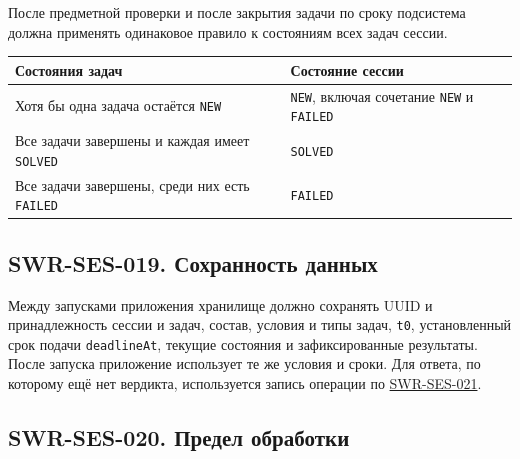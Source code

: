 \documentclass[12pt,a4paper]{article}
\begin{document}
\hypertarget{swr-ses-018-общая-функция-итога-сессии}{}

\hypertarget{swr-ses-018}{}

После предметной проверки и после закрытия задачи по сроку подсистема должна применять одинаковое правило к состояниям всех задач сессии.

{\def\LTcaptype{none} %
\begin{longtable}[]{@{}
  >{\raggedright\arraybackslash}p{}
  >{\raggedright\arraybackslash}p{}@{}}
\toprule\noalign{}
\begin{minipage}[b]{\linewidth}\raggedright
Состояния задач
\end{minipage} & \begin{minipage}[b]{\linewidth}\raggedright
Состояние сессии
\end{minipage} \\
\midrule\noalign{}
\endhead
\bottomrule\noalign{}
\endlastfoot
Хотя бы одна задача остаётся \texttt{NEW} & \texttt{NEW}, включая сочетание \texttt{NEW} и \texttt{FAILED} \\
Все задачи завершены и каждая имеет \texttt{SOLVED} & \texttt{SOLVED} \\
Все задачи завершены, среди них есть \texttt{FAILED} & \texttt{FAILED} \\
\end{longtable}
}

\subsection{SWR-SES-019. Сохранность данных}\label{swr-ses-019-ux441ux43eux445ux440ux430ux43dux43dux43eux441ux442ux44c-ux434ux430ux43dux43dux44bux445}

\hypertarget{swr-ses-019-сохранность-данных}{}

\hypertarget{swr-ses-019}{}

Между запусками приложения хранилище должно сохранять UUID и принадлежность сессии и задач, состав, условия и типы задач, \texttt{t0}, установленный срок подачи \texttt{deadlineAt}, текущие состояния и зафиксированные результаты. После запуска приложение использует те же условия и сроки. Для ответа, по которому ещё нет вердикта, используется запись операции по {\hyperlink{swr-ses-021}{SWR-SES-021}}.

\subsection{SWR-SES-020. Предел обработки}\label{swr-ses-020-ux43fux440ux435ux434ux435ux43b-ux43eux431ux440ux430ux431ux43eux442ux43aux438}
\end{document}
